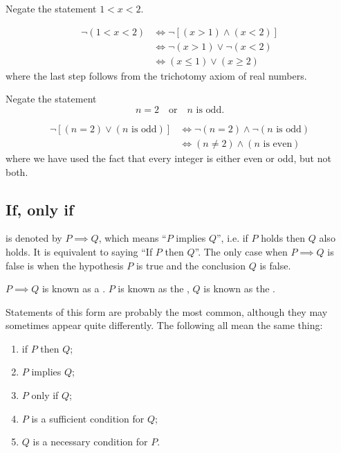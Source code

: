 \begin{exercise}
Negate the statement $1<x<2$.
\end{exercise}

\begin{solution}
\begin{align*}
\lnot(1<x<2)&\iff\lnot[(x>1)\land(x<2)]\\
&\iff\lnot(x>1)\lor\lnot(x<2)\\
&\iff(x\le1)\lor(x\ge2)
\end{align*}
where the last step follows from the trichotomy axiom of real numbers.
\end{solution}

\begin{exercise}
Negate the statement
\[n=2\quad\text{or}\quad n\text{ is odd.}\]
\end{exercise}

\begin{solution}
\begin{align*}
\lnot [(n = 2) \lor (n \text{ is odd})] &\iff \lnot(n = 2) \land \lnot(n \text{ is odd}) \\
&\iff (n \neq 2) \land (n \text{ is even})
\end{align*}
where we have used the fact that every integer is either even or odd, but not both.
\end{solution}
\pagebreak

\subsection{If, only if}
 is denoted by $P \implies Q$, which means ``$P$ implies $Q$'', i.e. if $P$ holds then $Q$ also holds. It is equivalent to saying ``If $P$ then $Q$''. The only case when $P \implies Q$ is false is when the hypothesis $P$ is true and the conclusion $Q$ is false.

$P \implies Q$ is known as a . $P$ is known as the , $Q$ is known as the .

Statements of this form are probably the most common, although they may sometimes appear quite differently. The following all mean the same thing:
\begin{enumerate}[label=(\roman*)]
\item if $P$ then $Q$;
\item $P$ implies $Q$;
\item $P$ only if $Q$;
\item $P$ is a sufficient condition for $Q$;
\item $Q$ is a necessary condition for $P$.
\end{enumerate}

